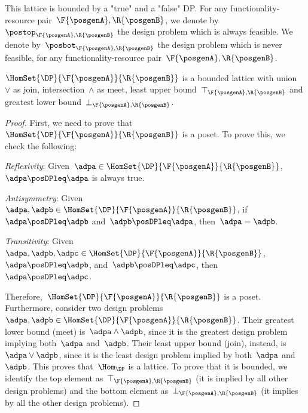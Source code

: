 This lattice is bounded by a "true" and a "false" DP.
For any functionality-resource pair~$\F{\posgenA},\R{\posgenB}$, we denote by~$\postop_{\F{\posgenA},\R{\posgenB}}$ the design problem which is always feasible.
We denote by~$\posbot_{\F{\posgenA},\R{\posgenB}}$ the design problem which is never feasible, for any functionality-resource pair~$\F{\posgenA},\R{\posgenB}$.

\begin{lemma}
    \label{lem:dpboundedlattice}
    $\HomSet{\DP}{\F{\posgenA}}{\R{\posgenB}}$ is a bounded lattice with union~$\vee$ as join, intersection~$\wedge$ as meet, least upper bound~$\top_{\F{\posgenA},\R{\posgenB}}$ and greatest lower bound~$\bot_{\F{\posgenA},\R{\posgenB}}$.
\end{lemma}

\begin{proof}
    First, we need to prove that~$\HomSet{\DP}{\F{\posgenA}}{\R{\posgenB}}$ is a poset. To prove this, we check the following:
% 
    \begin{compactitem}
        \item \emph{Reflexivity}: Given~$\adpa\in \HomSet{\DP}{\F{\posgenA}}{\R{\posgenB}}$,~$\adpa\posDPleq \adpa$ is always true.
        \item \emph{Antisymmetry}: Given~$\adpa,\adpb\in \HomSet{\DP}{\F{\posgenA}}{\R{\posgenB}}$, if~$\adpa\posDPleq \adpb$ and~$\adpb\posDPleq \adpa$, then~$\adpa=\adpb$.
        \item \emph{Transitivity}: Given~$\adpa,\adpb,\adpc\in \HomSet{\DP}{\F{\posgenA}}{\R{\posgenB}}$,~$\adpa\posDPleq \adpb$, and~$\adpb\posDPleq \adpc$, then~$\adpa\posDPleq \adpc$.
    \end{compactitem}
    Therefore,~$\HomSet{\DP}{\F{\posgenA}}{\R{\posgenB}}$ is a poset.
    Furthermore, consider two design problems~$\adpa,\adpb\in \HomSet{\DP}{\F{\posgenA}}{\R{\posgenB}}$.
    Their greatest lower bound (meet) is~$\adpa\wedge \adpb$, since it is the greatest design problem implying both~$\adpa$ and~$\adpb$.
    Their least upper bound (join), instead, is~$\adpa\vee \adpb$, since it is the least design problem implied by both~$\adpa$ and~$\adpb$.
    This proves that~$\Hom_\DP$ is a lattice.
    To prove that it is bounded, we identify the top element as~$\top_{\F{\posgenA},\R{\posgenB}}$ (it is implied by all other design problems) and the bottom element as~$\bot_{\F{\posgenA},\R{\posgenB}}$ (it implies by all the other design problems).
\end{proof}

